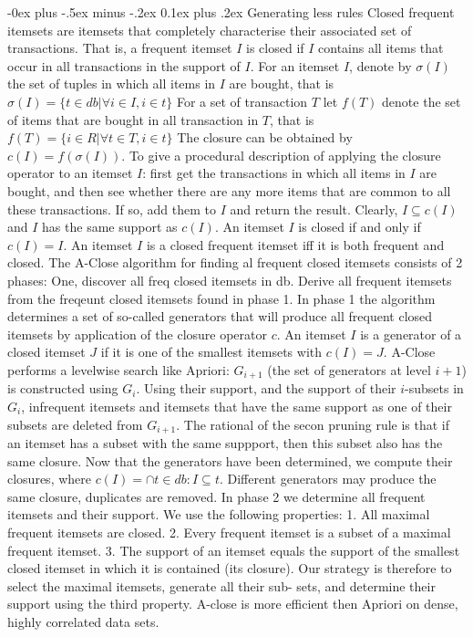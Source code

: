 \documentclass[8pt,landscape]{extarticle}
\makeatletter
\renewcommand{\subsubsection}{\@startsection{subsubsection}{3}{0mm}%
                                {-0ex plus -.5ex minus -.2ex}%
                                {0.1ex plus .2ex}%
                                {\normalfont\small\bfseries}}
\makeatother
\begin{document}
\begin{multicols}{3}
\subsubsection{Generating less rules}
Closed frequent itemsets are itemsets that completely characterise their
associated set of transactions.
That is, a frequent itemset $I$ is closed if $I$ contains all items that occur in
all transactions in the support of $I$.
For an itemset $I$, denote by $\sigma(I)$ the set of tuples in which all items
in $I$ are bought, that is $\sigma(I)=\{t \in db | \forall i \in I, i \in t\}$
For a set of transaction $T$ let $f(T)$ denote the set of items that are bought
in all transaction in $T$, that is $f(T)=\{i \in R | \forall t \in T, i \in t\}$
The closure can be obtained by $c(I)=f(\sigma(I))$.
To give a procedural description of applying the closure operator to an itemset
$I$:
first get the transactions in which all items in $I$ are bought,
and then see whether there are any more items that are common to all these
transactions.
If so, add them to $I$ and return the result.
Clearly, $I \subseteq c(I)$ and $I$ has the same support as $c(I)$.
An itemset $I$ is closed if and only if $c(I) = I$.
An itemset $I$ is a closed frequent itemset iff it is both frequent and closed.
The A-Close algorithm for finding al frequent closed itemsets consists of 2
phases: One, discover all freq closed itemsets in db. Derive all frequent
itemsets from the freqeunt closed itemsets found in phase 1.
In phase 1 the algorithm determines a set of so-called generators that will
produce all frequent closed itemsets by application of the closure operator $c$.
An itemset $I$ is a generator of a closed itemset $J$ if it is one of the
smallest itemsets with $c(I) = J$.
A-Close performs a levelwise search like Apriori:
$G_{i+1}$ (the set of generators at level $i + 1$) is constructed using $G_i$.
Using their support, and the support of their $i$-subsets in $G_i$,
infrequent itemsets and itemsets that have the same support as one of their
subsets are deleted from $G_{i+1}$. The rational of the secon pruning rule is
that if an itemset has a subset with the same suppport, then this subset also
has the same closure.
Now that the generators have been determined, we compute their closures,
where $c(I)=\cap t \in db: I \subseteq t$. Different generators may produce the
same closure, duplicates are removed.
In phase 2 we determine all frequent itemsets and their support.
We use the following properties:
1. All maximal frequent itemsets are closed.
2. Every frequent itemset is a subset of a maximal frequent itemset.
3. The support of an itemset equals the support of the smallest closed itemset
in which it is contained (its closure).
Our strategy is therefore to select the maximal itemsets,
generate all their sub- sets,
and determine their support using the third property.
A-close is more efficient then Apriori on dense, highly correlated data sets.

\end{multicols}
\end{document}
